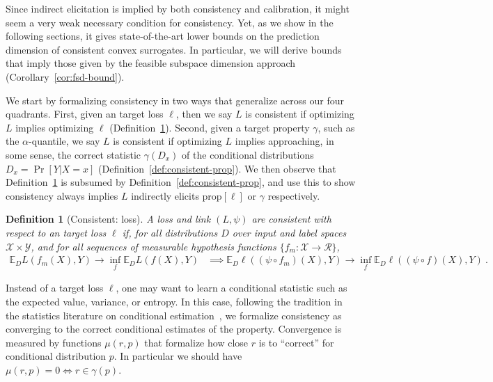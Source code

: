 \documentclass{article}
\newcommand{\Comments}{1}
\newcommand{\mytodo}[2]{\ifnum\Comments=1%
	\todo[linecolor=#1!80!black,backgroundcolor=#1,bordercolor=#1!80!black]{#2}\fi}
\newcommand{\raft}[1]{\mytodo{green!20!white}{RF: #1}}
\newcommand{\botodo}[1]{\mytodo{blue!20!white}{Bo: #1}}
\newcommand{\reals}{\mathbb{R}}
\newcommand{\prop}[1]{\mathrm{prop}[#1]}
\newcommand{\propdis}{\mu}
\newcommand{\E}{\mathbb{E}}
\newcommand{\R}{\mathcal{R}}
\newcommand{\X}{\mathcal{X}}
\newcommand{\Y}{\mathcal{Y}}
\newtheorem{definition}{Definition}
\begin{document}
Since indirect elicitation is implied by both consistency and calibration, it might seem a very weak necessary condition for consistency.
Yet, as we show in the following sections, it gives state-of-the-art lower bounds on the prediction dimension of consistent convex surrogates.
In particular, we will derive bounds that imply those given by the feasible subspace dimension approach (Corollary~\ref{cor:fsd-bound}).


We start by formalizing consistency in two ways that generalize across our four quadrants.
First, given an target loss $\ell$, then we say $L$ is consistent if optimizing $L$ implies optimizing $\ell$ (Definition~\ref{def:consistent-ell}).
Second, given a target property $\gamma$, such as the $\alpha$-quantile, we say $L$ is consistent if optimizing $L$ implies approaching, in some sense, the correct statistic $\gamma(D_x)$ of the conditional distributions $D_x = \Pr[Y|X=x]$ (Definition~\ref{def:consistent-prop}).
We then observe that Definition~\ref{def:consistent-ell} is subsumed by Definition~\ref{def:consistent-prop}, and use this to show consistency always implies $L$ indirectly elicits $\prop{\ell}$ or $\gamma$ respectively.

\begin{definition}[Consistent: loss]\label{def:consistent-ell}
	A loss and link $(L,\psi)$ are consistent with respect to an target loss $\ell$ if, for all distributions $D$ over input and label spaces $\X \times\Y$, and for all sequences of measurable hypothesis functions $\{f_m : \X \to \R\}$,
	\begin{align*}
	\E_D L(f_m(X), Y) \to \inf_f \E_D L(f(X), Y) &\implies \E_D \ell((\psi \circ f_m)(X), Y) \to \inf_f \E_D \ell((\psi \circ f)(X), Y)~.~
	\end{align*}
\end{definition}

Instead of a target loss $\ell$, one may want to learn a conditional statistic such as the expected value, variance, or entropy.
In this case, following the tradition in the statistics literature on conditional estimation~\citep{gyorfi2006distribution,fan1998efficient,ruppert1997local},
we formalize consistency as converging to the correct conditional estimates of the property.
Convergence is measured by functions $\propdis(r, p)$ that formalize how close $r$ is to ``correct'' for conditional distribution $p$.
In particular we should have $\propdis(r,p) = 0 \iff r \in \gamma(p)$.
\end{document}
